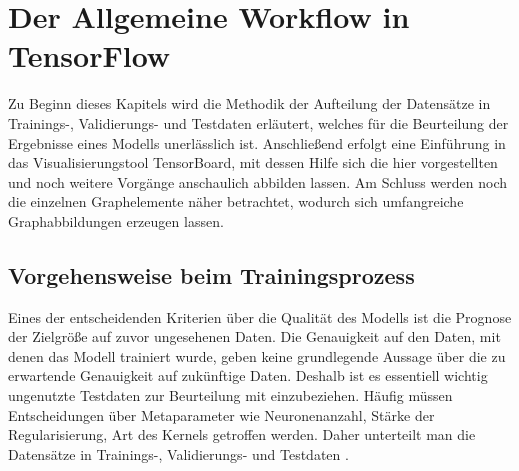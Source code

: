 \chapter{Der Allgemeine Workflow in TensorFlow}

Zu Beginn dieses Kapitels wird die Methodik der Aufteilung der Datensätze in Trainings-, Validierungs- und Testdaten erläutert, welches für die Beurteilung der Ergebnisse eines Modells unerlässlich ist. Anschließend erfolgt eine Einführung in das Visualisierungstool TensorBoard, mit dessen Hilfe sich die hier vorgestellten und noch weitere Vorgänge anschaulich abbilden lassen. Am Schluss werden noch die einzelnen Graphelemente näher betrachtet, wodurch sich umfangreiche Graphabbildungen erzeugen lassen. 


\section{Vorgehensweise beim Trainingsprozess}


Eines der entscheidenden Kriterien über die Qualität des Modells ist die Prognose der Zielgröße auf zuvor ungesehenen Daten. Die Genauigkeit auf den Daten, mit denen das Modell trainiert wurde, geben keine grundlegende Aussage über die zu erwartende Genauigkeit auf zukünftige Daten. Deshalb ist es essentiell wichtig ungenutzte Testdaten zur Beurteilung mit einzubeziehen. Häufig müssen Entscheidungen über Metaparameter wie Neuronenanzahl, Stärke der Regularisierung, Art des Kernels getroffen werden. Daher unterteilt man die Datensätze in Trainings-, Validierungs- und Testdaten \cite{hoffmann2014proceedings}.
\vspace{10pt}

